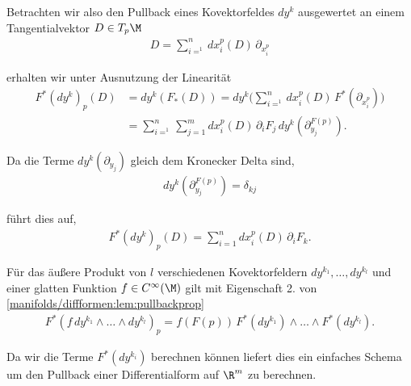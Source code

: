 \documentclass[letterpaper,10pt,english]{jupyterBook}
\begin{document}
\par
Betrachten wir also den Pullback eines Kovektorfeldes \(dy^k\) ausgewertet an einem Tangentialvektor \(D\in T_p\M\)
\begin{align*}
D = \sum_{i=^1}^n dx_i^p(D)\, \partial_{x_i^p}
\end{align*}
\par
erhalten wir unter Ausnutzung der Linearität
\begin{align*}
F^\ast(dy^k)_{p}(D) &= dy^k(F_\ast(D)) = 
dy^k\big(\sum_{i=^1}^n dx_i^p(D)\, F^\ast(\partial_{x_i^p})\big)\\
&=
\sum_{i=^1}^n \sum_{j=1}^m dx_i^p(D)\,\partial_i F_j\, dy^k(\partial_{y_j}^{F(p)}).
\end{align*}
\par
Da die Terme \(dy^k(\partial_{y_j})\) gleich dem Kronecker Delta sind,
\begin{align*}
dy^k(\partial_{y_j}^{F(p)}) = \delta_{kj}
\end{align*}
\par
führt dies auf,
\begin{align*}
F^\ast(dy^k)_{p}(D) =
\sum_{i=1}^n dx_i^p(D)\,\partial_i F_k.
\end{align*}
\par
Für das äußere Produkt von \(l\) verschiedenen Kovektorfeldern \(dy^{k_1},\ldots, dy^{k_l}\) und einer glatten Funktion \(f\in C^\infty(\M)\) gilt mit Eigenschaft 2. von \cref{manifolds/diffformen:lem:pullbackprop} \begin{align*}
F^\ast(f\, dy^{k_1}\wedge\ldots\wedge dy^{k_l})_{p} =
f(F(p))\, F^\ast(dy^{k_1})\wedge\ldots\wedge F^\ast(dy^{k_l}).
\end{align*}
\par
Da wir die Terme \(F^\ast(dy^{k_i})\) berechnen können liefert dies ein einfaches Schema um den Pullback einer Differentialform auf \(\R^m\) zu berechnen.
\end{document}
